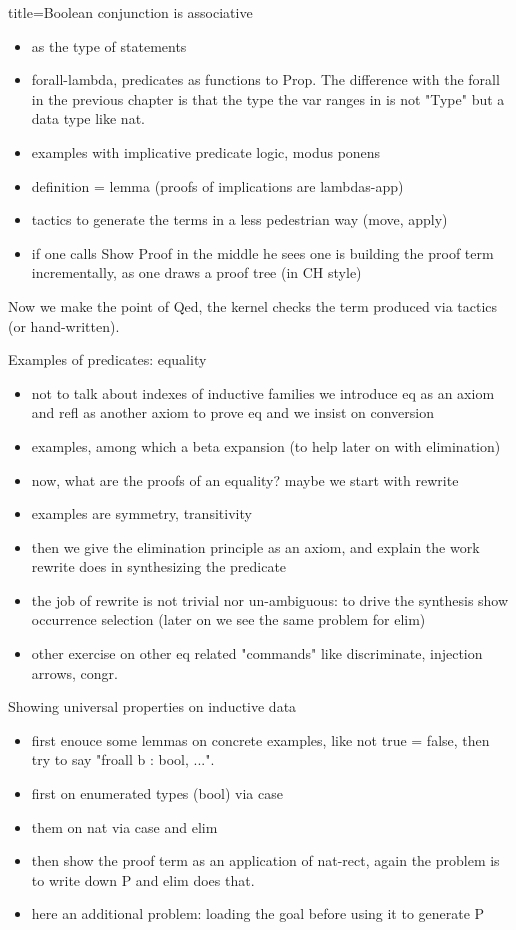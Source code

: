 \begin{coq}{title=Boolean conjunction is associative}
\begin{itemize}
\item {} as the type of statements
\item forall-lambda, predicates as functions to Prop.  The difference with the forall in the previous chapter is that the type the var ranges in is not "Type" but a data type like nat.
\item examples with implicative predicate logic, modus ponens
\item definition = lemma (proofs of implications are lambdas-app)
\item tactics to generate the terms in a less pedestrian way (move, apply)
\item if one calls Show Proof in the middle he sees one is building
	the proof term incrementally, as one draws a proof tree (in CH style)
\end{itemize}

Now we make the point of Qed, the kernel checks the term produced via
tactics (or hand-written).

Examples of predicates: equality
\begin{itemize}
\item not to talk about indexes of inductive families we introduce eq as
	an axiom and refl as another axiom to prove eq and we insist on
	conversion
\item examples, among which a beta expansion (to help later on with elimination)
\item now, what are the proofs of an equality? maybe we start with rewrite
\item examples are symmetry, transitivity
\item then we give the elimination principle as an axiom, and explain the
	work rewrite does in synthesizing the predicate
\item the job of rewrite is not trivial nor un-ambiguous: to drive the synthesis show occurrence selection (later on we see the same problem for elim)
\item other exercise on other eq related "commands" like discriminate, injection arrows, congr.
\end{itemize}

Showing universal properties on inductive data
\begin{itemize}
\item first enouce some lemmas on concrete examples, like not true = false,
	then try to say "froall b : bool, ...".
\item first on enumerated types (bool) via case
\item them on nat via case and elim
\item then show the proof term as an application of nat-rect, again the problem
	is to write down P and elim does that.
\item here an additional problem: loading the goal before using it to generate P
\end{itemize}


\end{coq}
